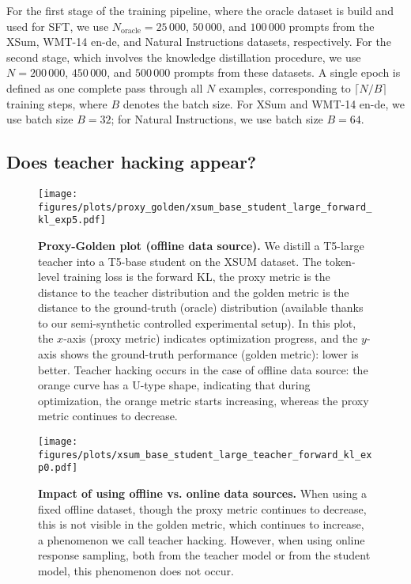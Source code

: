 For the first stage of the training pipeline, where the oracle dataset is build and used for SFT, we use $N_{\mathrm{oracle}} = 25\,000$, $50\,000$, and $100\,000$ prompts from the XSum, WMT-14 en-de, and Natural Instructions datasets, respectively. For the second stage, which involves the knowledge distillation procedure, we use $N = 200\,000$, $450\,000$, and $500\,000$ prompts from these datasets. A single epoch is defined as one complete pass through all $N$ examples, corresponding to $\lceil N / B \rceil$ training steps, where $B$ denotes the batch size. For XSum and WMT-14 en-de, we use batch size $B=32$; for Natural Instructions, we use batch size $B=64$.


\subsection{Does teacher hacking appear?}\label{sec:online_vs_offline}



\begin{figure}[ht]
    \centering
    \texttt{[image: figures/plots/proxy\_golden/xsum\_base\_student\_large\_forward\_kl\_exp5.pdf]}

    \caption{\textbf{Proxy-Golden plot (offline data source).}
    We distill a T5-large teacher into a T5-base student on the XSUM dataset. The token-level training loss is the forward KL, the proxy metric is the distance to the teacher distribution and the golden metric is the distance to the ground-truth (oracle) distribution (available thanks to our semi-synthetic controlled experimental setup).
    In this plot, the $x$-axis (proxy metric) indicates optimization progress, and the $y$-axis shows the ground-truth performance (golden metric): lower is better. Teacher hacking occurs in the case of offline data source: the orange curve has a U-type shape, indicating that during optimization, the orange metric starts increasing, whereas the proxy metric continues to decrease.
    }
    \label{fig:proxy_golden_exp_large_to_base_offline_vs_online_fwd_kl}
\end{figure}




\begin{figure*}[ht]
    \centering
    \texttt{[image: figures/plots/xsum\_base\_student\_large\_teacher\_forward\_kl\_exp0.pdf]}
    \caption{\textbf{Impact of using offline vs. online data sources.} 
     When using a fixed offline dataset, though the proxy metric continues to decrease, this is not visible in the golden metric, which continues to increase, a phenomenon we call teacher hacking. However, when using online response sampling, both from the teacher model or from the student model, this phenomenon does not occur.
    }
    \label{fig:main_exp_xsum_fwd_kl_base_large}
\end{figure*}


